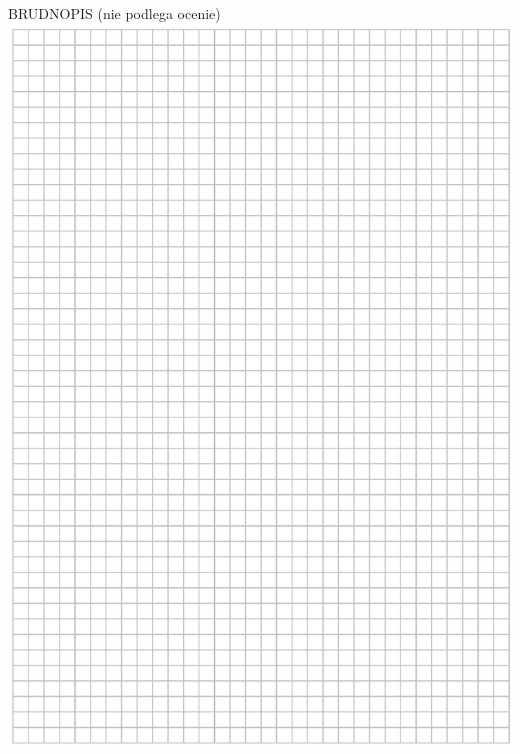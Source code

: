 \documentclass[10pt]{article}
\begin{document}
BRUDNOPIS (nie podlega ocenie)\\
\includegraphics[max width=\textwidth, center]{2024_11_21_465acd0c12fa3e05e8a7g-24}\\
\end{document}
